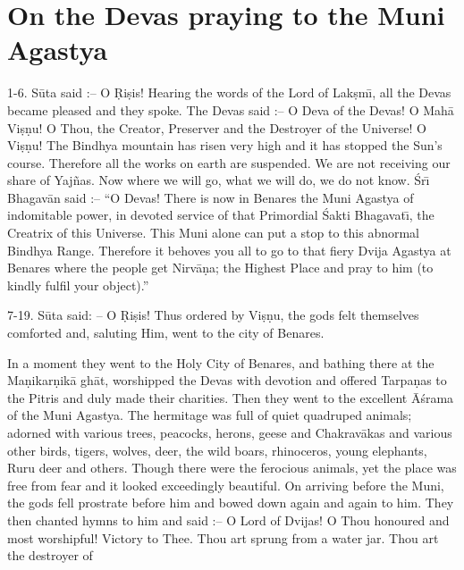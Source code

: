 \chapter{On the Devas praying to the Muni Agastya}

1-6. S\=uta said :-- O \d{R}i\d{s}is! Hearing the words of the Lord of Lak\d{s}m\={\i}, all the Devas became pleased and they spoke. The Devas said :-- O Deva of the Devas! O Mah\=a Vi\d{s}\d{n}u! O Thou, the Creator, Preserver and the Destroyer of the Universe! O Vi\d{s}\d{n}u! The Bindhya mountain has risen very high and it has stopped the Sun's course. Therefore all the works on earth are suspended. We are not receiving our share of Yaj\~nas. Now where we will go, what we will do, we do not know. \'Sr\={\i} Bhagav\=an said :-- ``O Devas! There is now in Benares the Muni Agastya of indomitable power, in devoted service of that Primordial \'Sakti Bhagavat\={\i}, the Creatrix of this Universe. This Muni alone can put a stop to this abnormal Bindhya Range. Therefore it behoves you all to go to that fiery Dvija Agastya at Benares where the people get Nirv\=a\d{n}a; the Highest Place and pray to him (to kindly fulfil your object).''

7-19. S\=uta said: -- O \d{R}i\d{s}is! Thus ordered by Vi\d{s}\d{n}u, the gods felt themselves comforted and, saluting Him, went to the city of Benares.

In a moment they went to the Holy City of Benares, and bathing there at the Ma\d{n}ikar\d{n}ik\=a gh\=at, worshipped the Devas with devotion and offered Tarpa\d{n}as to the Pitris and duly made their charities. Then they went to the excellent \=A\'srama of the Muni Agastya. The hermitage was full of quiet quadruped animals; adorned with various trees, peacocks, herons, geese and Chakrav\=akas and various other birds, tigers, wolves, deer, the wild boars, rhinoceros, young elephants, Ruru deer and others. Though there were the ferocious animals, yet the place was free from fear and it looked exceedingly beautiful. On arriving before the Muni, the gods fell prostrate before him and bowed down again and again to him. They then chanted hymns to him and said :-- O Lord of Dvijas! O Thou honoured and most worshipful! Victory to Thee. Thou art sprung from a water jar. Thou art the destroyer of

